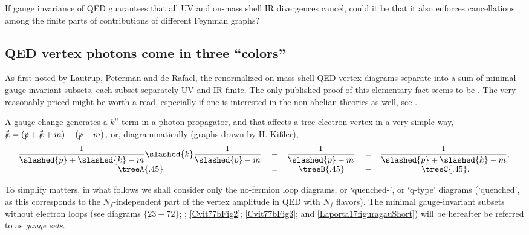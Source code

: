 If gauge invariance of QED guarantees that all UV and on-mass shell IR
divergences cancel, could it be that it also enforces cancellations among
the finite parts of contributions of different Feynman graphs?

\subsection{QED vertex photons come in three ``colors''}
\label{sect:gaugeSetDeriv}

As first noted by Lautrup, Peterman and de Rafael, the
renormalized on-mass shell QED vertex diagrams separate into a sum of
minimal gauge-invariant subsets, each subset separately UV and IR finite.
The only published proof of this elementary fact seems to be
. The very reasonably priced  might be
worth a read, especially if one is interested in the non-abelian
theories as well,
see .

A gauge change generates a $k^\mu$ term in a photon propagator,
and that affects a tree electron vertex in a very simple way,
\(
\slashed{k} = (\slashed{p}+\slashed{k}+m) - (\slashed{p}+m)
\,,
\)
or, diagrammatically (graphs drawn by H.
Ki{\ss}ler),
\begin{align}
  \begin{tabular}{ccccc}
$\!{\begin{aligned}\frac{1}{\slashed{p}+\slashed{k}-m}\slashed{k}\frac{1}{\slashed{p}-m}\end{aligned}}$ &
$=$ &    $\!{\begin{aligned}\frac{1}{\slashed{p}-m}\end{aligned}}$ &
$-$ &    $\!{\begin{aligned}\frac{1}{\slashed{p}+\slashed{k}-m},\end{aligned}}$
\\
$\treeA{.45}$ & $=$ & $\treeB{.45}$ & $-$ & $\treeC{.45}$.
  \end{tabular}
  \label{KisKre16eq:treeLevel1}
\end{align}

To simplify matters, in what follows we shall consider only the
no-fermion loop diagrams, or `quenched-', or `q-type' diagrams
(`quenched', as this corresponds to the $N_f$-independent part of the
vertex amplitude in
QED with $N_f$ flavors).
The minimal gauge-invariant subsets without electron loops (see
 diagrams $\{23-72\}$; ;
\ref{Cvit77bFig2}; \ref{Cvit77bFig3}; and \ref{Laporta17figuragauShort})
will be hereafter be referred to as \emph{gauge sets}.

